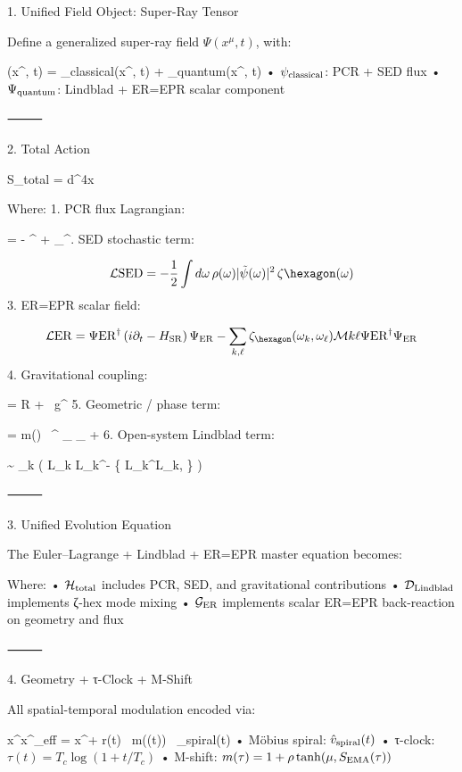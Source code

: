 1. Unified Field Object: Super-Ray Tensor

Define a generalized super-ray field $\Psi(x^\mu, t)$, with:

\Psi(x^\mu, t) =
\psi_{\rm classical}(x^\mu, t) + \Psi_{\rm quantum}(x^\mu, t)
	•	$\psi_{\rm classical}$: PCR + SED flux
	•	$\Psi_{\rm quantum}$: Lindblad + ER=EPR scalar component

⸻

2. Total Action

S_{\rm total} = \int d^4x \,  

Where:
	1.	PCR flux Lagrangian:

 = - \Phi{\mu\nu}\Phi^{\mu\nu} +  \psi_\mu \psi^.	SED stochastic term:

\[
\mathcal{L}{\rm SED} = - \frac{1}{2} \int d\omega \, \rho(\omega) |\tilde{\psi}(\omega)|^2 \, \zeta{\hexagon}(\omega)
\]
	3.	ER=EPR scalar field:

\[
\mathcal{L}{\rm ER} = \Psi{\rm ER}^\dagger \left(i \partial_t - H_{\rm SR} \right) \Psi_{\rm ER} - \sum_{k,\ell} \zeta_{\hexagon}(\omega_k,\omega_\ell) \mathcal{M}{k\ell} \Psi{\rm ER}^\dagger \Psi_{\rm ER}
\]
	4.	Gravitational coupling:

 =  R +  \, \Im{} g^{\mu\nu}
	5.	Geometric / phase term:

 =  m(\tau) \, \epsilon^{\mu\nu\rho\sigma} \Phi_{\mu\nu} \Phi_{\rho\sigma} + 
	6.	Open-system Lindblad term:

 \sim {} \gamma_{k\ell} \Big( L_{k\ell} \rho L_{k\ell}^\dagger -  \{ L_{k\ell}^\dagger L_{k\ell}, \rho \} \Big)

⸻

3. Unified Evolution Equation

The Euler–Lagrange + Lindblad + ER=EPR master equation becomes:


Where:
	•	$\mathcal{H}_{\rm total}$ includes PCR, SED, and gravitational contributions
	•	$\mathcal{D}_{\rm Lindblad}$ implements ζ-hex mode mixing
	•	$\mathcal{G}_{\rm ER}$ implements scalar ER=EPR back-reaction on geometry and flux

⸻

4. Geometry + τ-Clock + M-Shift

All spatial-temporal modulation encoded via:

x^\mu \mapsto x^\mu_{\rm eff} = x^\mu + r(t) \, m(\tau(t)) \, _{\rm spiral}(t)
	•	Möbius spiral: $\hat{v}_{\rm spiral}(t)$
	•	τ-clock: $\tau(t) = T_c \log(1 + t/T_c)$
	•	M-shift: $m(\tau) = 1 + \rho \tanh(\mu , S_{\rm EMA}(\tau))$
